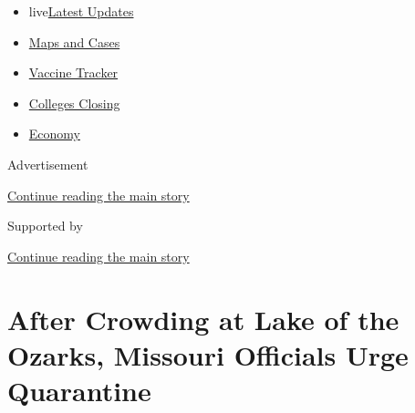 \begin{itemize}
\tightlist
\item
  live\href{https://www.nytimes3xbfgragh.onion/2020/08/21/world/covid-19-coronavirus.html?name=styln-coronavirus-national\&region=TOP_BANNER\&variant=undefined\&block=storyline_menu_recirc\&action=click\&pgtype=Article\&impression_id=da7741f1-e3a1-11ea-9cb4-a7d529c3feb9}{Latest
  Updates}
\item
  \href{https://www.nytimes3xbfgragh.onion/interactive/2020/us/coronavirus-us-cases.html?name=styln-coronavirus-national\&region=TOP_BANNER\&variant=undefined\&block=storyline_menu_recirc\&action=click\&pgtype=Article\&impression_id=da7741f2-e3a1-11ea-9cb4-a7d529c3feb9}{Maps
  and Cases}
\item
  \href{https://www.nytimes3xbfgragh.onion/interactive/2020/science/coronavirus-vaccine-tracker.html?name=styln-coronavirus-national\&region=TOP_BANNER\&variant=undefined\&block=storyline_menu_recirc\&action=click\&pgtype=Article\&impression_id=da776900-e3a1-11ea-9cb4-a7d529c3feb9}{Vaccine
  Tracker}
\item
  \href{https://www.nytimes3xbfgragh.onion/2020/08/19/us/colleges-closing-covid.html?name=styln-coronavirus-national\&region=TOP_BANNER\&variant=undefined\&block=storyline_menu_recirc\&action=click\&pgtype=Article\&impression_id=da776901-e3a1-11ea-9cb4-a7d529c3feb9}{Colleges
  Closing}
\item
  \href{https://www.nytimes3xbfgragh.onion/live/2020/08/20/business/stock-market-today-coronavirus?name=styln-coronavirus-national\&region=TOP_BANNER\&variant=undefined\&block=storyline_menu_recirc\&action=click\&pgtype=Article\&impression_id=da776902-e3a1-11ea-9cb4-a7d529c3feb9}{Economy}
\end{itemize}

Advertisement

\protect\hyperlink{after-top}{Continue reading the main story}

Supported by

\protect\hyperlink{after-sponsor}{Continue reading the main story}

\hypertarget{after-crowding-at-lake-of-the-ozarks-missouri-officials-urge-quarantine}{%
\section{After Crowding at Lake of the Ozarks, Missouri Officials Urge
Quarantine}\label{after-crowding-at-lake-of-the-ozarks-missouri-officials-urge-quarantine}}

